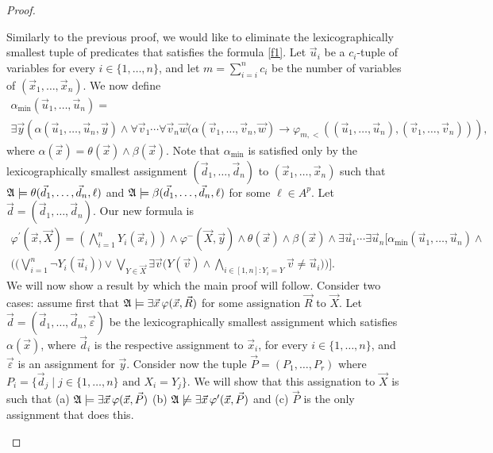 \documentclass[12pt]{article}
\def\A{{\frak A}}
\def\P{\vec{P}}
\def\R{\vec{R}}
\def\X{\vec{X}}
\def\d{\vec{d}} %
\def\u{\vec{u}} %
\def\v{\vec{v}} %
\def\w{\vec{w}} %
\def\x{\vec{x}} %
\def\y{\vec{y}} %
\def\ep{\vec{\varepsilon}}
\begin{document}
\begin{proof}
\begin{enumerate}
Similarly to the previous proof, we would like to eliminate the lexicographically smallest tuple of predicates that satisfies the formula \eqref{f1}. Let $\u_i$ be a $c_i$-tuple of variables for every $i \in \{1,\dots,n\}$, and let $m = \sum_{i = i}^n c_i$ be the number of variables of $(\x_1,\dots,\x_n)$. We now define
\begin{multline*}
\alpha_{\min}(\u_1,\dots,\u_n) = \\ \exists\y\left( \alpha(\u_1,\dots,\u_n,\y)\wedge \forall\v_1\cdots\forall\v_n\w(\alpha(\v_1,\dots,\v_n,\w)\rightarrow \varphi_{m,<}((\u_1,\dots,\u_n),(\v_1,\dots,\v_n))\right),
\end{multline*}
where $\alpha(\x) = \theta(\x) \wedge \beta(\x)$. Note that $\alpha_{\min}$ is satisfied only by the lexicographically \linebreak smallest assignment $(\d_1,\dots,\d_n)$ to $(\x_1,\dots,\x_n)$ such that $\A\models\theta(\d_1,\dots,\d_n,\ell)$ and $\A\models\beta(\d_1,\dots,\d_n,\ell)$ for some $\ell \in A^p$. Let $\d = (\d_1,\dots,\d_n)$. Our new formula is
\begin{multline}
\varphi^\prime(\x,\X) = \left( \bigwedge_{i=1}^n Y_i(\x_i) \right) \wedge \varphi^{-}(\X,\y) \wedge \theta(\x) \wedge \beta(\x)\wedge\exists\u_1\cdots\exists\u_n\bigg[\alpha_{\min}(\u_1,\dots,\u_n) \wedge \\ \bigg(\bigg(\bigvee_{i = 1}^{n}\neg Y_i(\u_i) \bigg) \vee \bigvee_{Y\in\X} \exists \v\Big( Y(\v) \wedge \bigwedge_{i\in[1,n]: Y_i = Y} \v \neq \u_i\Big) \bigg) \bigg] \label{f2}.
\end{multline}
We will now show a result by which the main proof will follow. Consider two cases: assume first that $\A\models\exists\x\,\varphi(\x,\R)$ for some assignation $\R$ to $\X$. Let $\d = (\d_1,\dots,\d_n,\ep)$ be the lexicographically smallest assignment which satisfies $\alpha(\x)$, where $\d_i$ is the respective assignment to $\x_i$, for every $i\in\{1,\dots,n\}$, and $\ep$ is an assignment for $\y$. Consider now the tuple $\P = (P_1,\dots,P_r)$ where $P_i = \{\d_j \mid j\in\{1,\dots,n\} \text{ and } X_i = Y_j \}$. We will show that this assignation to $\X$ is such that (a) $\A\models\exists\x\,\varphi(\x,\P)$ (b) $\A\not\models\exists\x\,\varphi^\prime(\x,\P)$ and (c) $\P$ is the only assignment that does this.
\begin{enumerate}

\end{enumerate}
\end{enumerate}
\end{proof}
\end{document}
